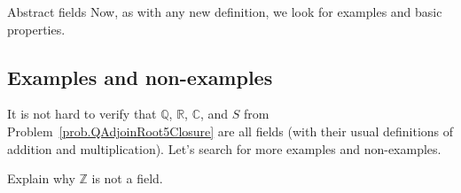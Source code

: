 \begin{section}{Abstract fields}
Now, as with any new definition, we look for examples and basic properties.

\subsection{Examples and non-examples}

It is not hard to verify that $\mathbb{Q}$, $\mathbb{R}$, $\mathbb{C}$, and $S$ from Problem~\ref{prob.QAdjoinRoot5Closure} are all fields (with their usual definitions of addition and multiplication). Let's search for more examples and non-examples.

\begin{problem}
Explain why $\mathbb{Z}$ is not a field.
\end{problem}


\end{section}
